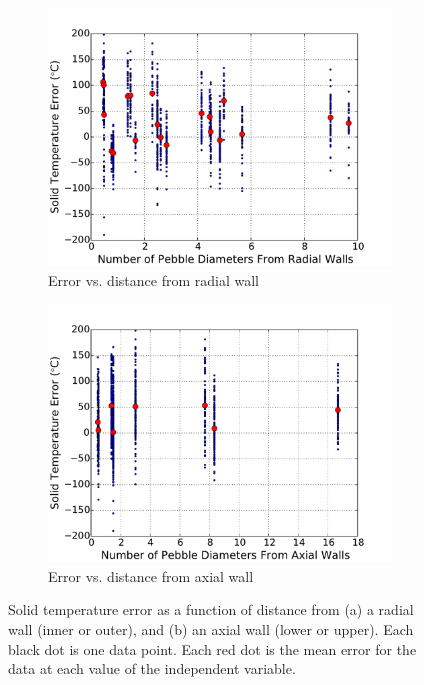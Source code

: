 \begin{figure}[h!]
    \begin{subfigure}{0.5\linewidth}
        \centering
        \includegraphics[width=1.0\linewidth]{figs/error_radial.pdf}
       \caption{Error vs. distance from radial wall}
       \label{fig:error_locationa}
    \end{subfigure}
    \begin{subfigure}{0.5\linewidth}
        \centering
        \includegraphics[width=1.0\linewidth]{figs/error_axial.pdf}
        \caption{Error vs. distance from axial wall}
        \label{fig:error_locationb}
    \end{subfigure}
    \caption{Solid temperature error as a function of distance from (a) a radial wall (inner or outer), and (b) an axial wall (lower or upper). Each black dot is one data point. Each red dot is the mean error for the data at each value of the independent variable.}
    \label{fig:error_location}
\end{figure}

